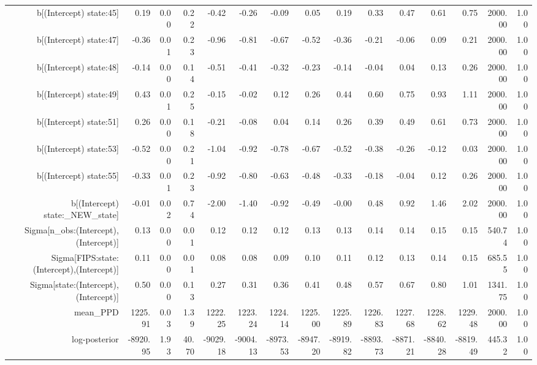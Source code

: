 \begin{table}[ht]
\begin{tabular}{rrrrrrrrrrrrrrr}
  b[(Intercept) state:45] & 0.19 & 0.00 & 0.22 & -0.42 & -0.26 & -0.09 & 0.05 & 0.19 & 0.33 & 0.47 & 0.61 & 0.75 & 2000.00 & 1.00 \\ 
  b[(Intercept) state:47] & -0.36 & 0.01 & 0.23 & -0.96 & -0.81 & -0.67 & -0.52 & -0.36 & -0.21 & -0.06 & 0.09 & 0.21 & 2000.00 & 1.00 \\ 
  b[(Intercept) state:48] & -0.14 & 0.00 & 0.14 & -0.51 & -0.41 & -0.32 & -0.23 & -0.14 & -0.04 & 0.04 & 0.13 & 0.26 & 2000.00 & 1.00 \\ 
  b[(Intercept) state:49] & 0.43 & 0.01 & 0.25 & -0.15 & -0.02 & 0.12 & 0.26 & 0.44 & 0.60 & 0.75 & 0.93 & 1.11 & 2000.00 & 1.00 \\ 
  b[(Intercept) state:51] & 0.26 & 0.00 & 0.18 & -0.21 & -0.08 & 0.04 & 0.14 & 0.26 & 0.39 & 0.49 & 0.61 & 0.73 & 2000.00 & 1.00 \\ 
  b[(Intercept) state:53] & -0.52 & 0.00 & 0.21 & -1.04 & -0.92 & -0.78 & -0.67 & -0.52 & -0.38 & -0.26 & -0.12 & 0.03 & 2000.00 & 1.00 \\ 
  b[(Intercept) state:55] & -0.33 & 0.01 & 0.23 & -0.92 & -0.80 & -0.63 & -0.48 & -0.33 & -0.18 & -0.04 & 0.12 & 0.26 & 2000.00 & 1.00 \\ 
  b[(Intercept) state:\_NEW\_state] & -0.01 & 0.02 & 0.74 & -2.00 & -1.40 & -0.92 & -0.49 & -0.00 & 0.48 & 0.92 & 1.46 & 2.02 & 2000.00 & 1.00 \\ 
  Sigma[n\_obs:(Intercept),(Intercept)] & 0.13 & 0.00 & 0.01 & 0.12 & 0.12 & 0.12 & 0.13 & 0.13 & 0.14 & 0.14 & 0.15 & 0.15 & 540.74 & 1.00 \\ 
  Sigma[FIPS:state:(Intercept),(Intercept)] & 0.11 & 0.00 & 0.01 & 0.08 & 0.08 & 0.09 & 0.10 & 0.11 & 0.12 & 0.13 & 0.14 & 0.15 & 685.55 & 1.00 \\ 
  Sigma[state:(Intercept),(Intercept)] & 0.50 & 0.00 & 0.13 & 0.27 & 0.31 & 0.36 & 0.41 & 0.48 & 0.57 & 0.67 & 0.80 & 1.01 & 1341.75 & 1.00 \\ 
  mean\_PPD & 1225.91 & 0.03 & 1.39 & 1222.25 & 1223.24 & 1224.14 & 1225.00 & 1225.89 & 1226.83 & 1227.68 & 1228.62 & 1229.48 & 2000.00 & 1.00 \\ 
  log-posterior & -8920.95 & 1.93 & 40.70 & -9029.18 & -9004.13 & -8973.53 & -8947.20 & -8919.82 & -8893.73 & -8871.21 & -8840.28 & -8819.49 & 445.32 & 1.00 \\ 
   \hline
\end{tabular}
\end{table}
